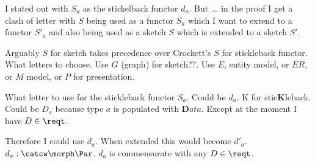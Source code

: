 \begin{aside}
I stated out with $S_a$ as the stickelback functor $d_a$.
But ... in the proof I get a clash of letter with $S$ being used as 
a functor $S_a$ which I want to extend to a functor $S'_a$ and also
being used as a sketch $S$ which is extended to a sketch $S'$.

Arguably $S$ for sketch takes precedence over Crockett's $S$ for 
stickleback functor.
What letters to choose. Use $G$ (graph) for sketch??. Use $E$, entity model, or $ER$, or $M$ model, or $P$ for presentation.

What letter to use for the stickleback functor $S_a$. Could be $d_a$. 
K for stic\textbf{K}leback. Could be $D_a$ because type $a$ is populated with $\textbf{D}ata$. Except at the moment I have $D \in \reqt$.

Therefore I could use $d_a$. When extended this would become $d'_a$.
$d_a : \catcw \morph \Par$. $d_a$ is commensurate with any $D \in \reqt$.
\end{aside}
